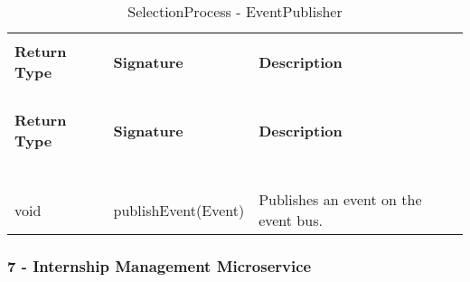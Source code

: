 \begin{longtable}{p{}p{}p{}}
    \caption{SelectionProcess - EventPublisher}
    \vspace{0.5em}\\
    \hline
    \vspace{0.5em}\\
    \textbf{Return Type} & \textbf{Signature} & \textbf{Description} \\
    \vspace{0.5em}\\
    \hline
    \vspace{0.5em}\\
    \endfirsthead
    \vspace{0.5em}\\
    \hline
    \vspace{0.5em}\\
    \textbf{Return Type} & \textbf{Signature} & \textbf{Description} \\
    \vspace{0.5em}\\
    \hline
    \vspace{0.5em}\\
    \endhead
    
    \vspace{0.5em}\\
    \hline
    \vspace{0.5em}\\
    \endfoot
    
    \vspace{0.5em}\\
    \hline
    \vspace{0.5em}\\
    \endlastfoot
    
    void &
    publishEvent(Event) &
    Publishes an event on the event bus. \\

\end{longtable}

\subsubsection{7 - Internship Management Microservice}

